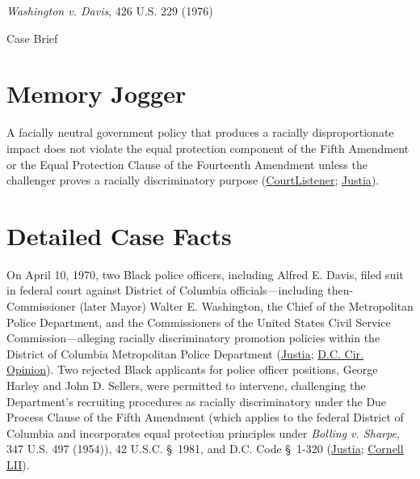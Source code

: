\documentclass[12pt]{article}
\begin{document}
\begin{center}
{\LARGE \textit{Washington v. Davis}, 426 U.S. 229 (1976)\par}
\vspace{0.8em}
{\large Case Brief\par}
\end{center}
\vspace{1em}

\section{Memory Jogger}

A facially neutral government policy that produces a racially disproportionate impact does not violate the equal protection component of the Fifth Amendment or the Equal Protection Clause of the Fourteenth Amendment unless the challenger proves a racially discriminatory purpose (\href{https://www.courtlistener.com/opinion/109469/washington-v-davis/}{CourtListener}; \href{https://supreme.justia.com/cases/federal/us/426/229/}{Justia}).

\section{Detailed Case Facts}

On April 10, 1970, two Black police officers, including Alfred E. Davis, filed suit in federal court against District of Columbia officials---including then-Commissioner (later Mayor) Walter E. Washington, the Chief of the Metropolitan Police Department, and the Commissioners of the United States Civil Service Commission---alleging racially discriminatory promotion policies within the District of Columbia Metropolitan Police Department (\href{https://supreme.justia.com/cases/federal/us/426/229/}{Justia}; \href{https://law.justia.com/cases/federal/appellate-courts/F2/512/956/286050/}{D.C. Cir. Opinion}). Two rejected Black applicants for police officer positions, George Harley and John D. Sellers, were permitted to intervene, challenging the Department's recruiting procedures as racially discriminatory under the Due Process Clause of the Fifth Amendment (which applies to the federal District of Columbia and incorporates equal protection principles under \textit{Bolling v. Sharpe}, 347 U.S. 497 (1954)), 42 U.S.C. \S~1981, and D.C. Code \S~1-320 (\href{https://supreme.justia.com/cases/federal/us/426/229/}{Justia}; \href{https://www.law.cornell.edu/constitution-conan/amendment-14/facially-neutral-laws-implicating-suspect-classifications}{Cornell LII}).
\end{document}
